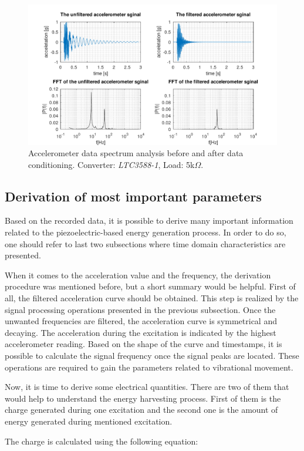 \documentclass[12pt,a4paper]{article}
\begin{document}
\begin{landscape}
\begin{figure}[ht!]
\includegraphics[scale=1.2]{spectrum.pdf}
\caption{Accelerometer data spectrum analysis before and after data conditioning. Converter: \textit{LTC3588-1}, Load: 5k$\Omega$.}
\label{fig:spectrum}
\end{figure}
\end{landscape}

\subsection{Derivation of most important parameters}
Based on the recorded data, it is possible to derive many important information related to the piezoelectric-based energy generation process. In order to do so, one should refer to last two subsections where time domain characteristics are presented.
\par
When it comes to the acceleration value and the frequency, the derivation procedure was mentioned before, but a short summary would be helpful. First of all, the filtered acceleration curve should be obtained. This step is realized by the signal processing operations presented in the previous subsection. Once the unwanted frequencies are filtered, the acceleration curve is symmetrical and decaying. The acceleration during the excitation is indicated by the highest accelerometer reading. Based on the shape of the curve and timestamps, it is possible to calculate the signal frequency once the signal peaks are located. These operations are required to gain the parameters related to vibrational movement.
\par
Now, it is time to derive some electrical quantities. There are two of them that would help to understand the energy harvesting process. First of them is the charge generated during one excitation and the second one is the amount of energy generated during mentioned excitation.
\par
The charge is calculated using the following equation:
\end{document}
